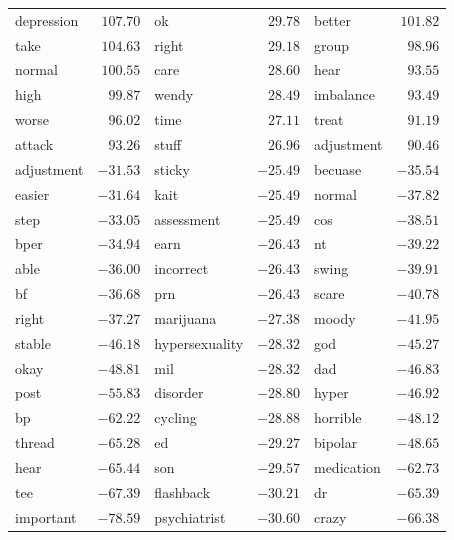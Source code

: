 \begin{table}[p]
\begin{tabular}{lrlrlr}
       depression & $107.70$ &         ok & $ 29.78$ &      better & $ 101.82$ \\
             take & $104.63$ &      right & $ 29.18$ &       group & $  98.96$ \\
           normal & $100.55$ &       care & $ 28.60$ &        hear & $  93.55$ \\
             high & $ 99.87$ &      wendy & $ 28.49$ &   imbalance & $  93.49$ \\
            worse & $ 96.02$ &       time & $ 27.11$ &       treat & $  91.19$ \\
           attack & $ 93.26$ &      stuff & $ 26.96$ &  adjustment & $  90.46$ \\
    \midrule
     adjustment & $  -31.53$ &          sticky & $-25.49$ &     becuase & $ -35.54$ \\
         easier & $  -31.64$ &            kait & $-25.49$ &      normal & $ -37.82$ \\
           step & $  -33.05$ &      assessment & $-25.49$ &         cos & $ -38.51$ \\
           bper & $  -34.94$ &            earn & $-26.43$ &          nt & $ -39.22$ \\
           able & $  -36.00$ &       incorrect & $-26.43$ &       swing & $ -39.91$ \\
             bf & $  -36.68$ &             prn & $-26.43$ &       scare & $ -40.78$ \\
          right & $  -37.27$ &       marijuana & $-27.38$ &       moody & $ -41.95$ \\
         stable & $  -46.18$ &  hypersexuality & $-28.32$ &         god & $ -45.27$ \\
           okay & $  -48.81$ &             mil & $-28.32$ &         dad & $ -46.83$ \\
           post & $  -55.83$ &        disorder & $-28.80$ &       hyper & $ -46.92$ \\
             bp & $  -62.22$ &         cycling & $-28.88$ &    horrible & $ -48.12$ \\
         thread & $  -65.28$ &              ed & $-29.27$ &     bipolar & $ -48.65$ \\
           hear & $  -65.44$ &             son & $-29.57$ &  medication & $ -62.73$ \\
            tee & $  -67.39$ &       flashback & $-30.21$ &          dr & $ -65.39$ \\
      important & $  -78.59$ &    psychiatrist & $-30.60$ &       crazy & $ -66.38$ \\

\end{tabular}
\end{table}

